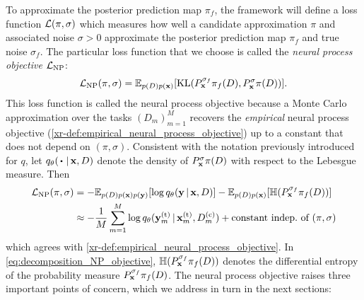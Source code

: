 \documentclass[12pt, twoside]{report}
\newcommand{\xrprefix}[1]{xr-#1}
\begin{document}
To approximate the posterior prediction map $\pi_f$,
the framework will define a loss function $\mathcal{L}(\pi, \sigma)$ which measures how well a candidate approximation $\pi$ and associated noise $\sigma > 0$ approximate the posterior prediction map $\pi_f$ and true noise $\sigma_f$.
The particular loss function that we choose is called the \emph{neural process objective} $\L\ss{NP}$:
\begin{equation}
    \L\ss{NP}(\pi, \sigma)
    = \E_{p(D)p(\vx)}[\KL(P^{\sigma_f}_\vx \pi_f(D), P^{\sigma}_\vx \pi(D))].
\end{equation}
This loss function is called the neural process objective because a Monte Carlo approximation over the tasks $(D_m)_{m=1}^M$
recovers the \emph{empirical} neural process objective (\cref{\xrprefix{def:empirical_neural_process_objective}}) up to a constant that does not depend on $(\pi, \sigma)$.
Consistent with the notation previously introduced for $q$, let $q_\theta(\vardot\cond \vx, D)$ denote the density of $P^\sigma_{\mathbf{x}} \pi(D)$ with respect to the Lebesgue measure. %
Then
\begin{align}
    \L\ss{NP}(\pi, \sigma)
    &= -\E_{p(D)p(\vx)p(\vy)}[\log q_{\theta}(\vy \cond \vx, D)]
    - \E_{p(D)p(\vx)}[\Hb(P^{\sigma_f}_\vx \pi_f(D))] \label{eq:decomposition_NP_objective} \\
    &\approx -\frac1M \sum_{m=1}^M \log q_{\theta}(\vy_m\us{(t)} \cond \vx\us{(t)}_m, D\us{(c)}_m)
    + \text{constant indep.\ of $(\pi, \sigma)$}
    \label{eq:neural_process_objective_next_to_KL_objective}
\end{align}
which agrees with \cref{\xrprefix{def:empirical_neural_process_objective}}.
In \eqref{eq:decomposition_NP_objective}, $\mathbb{H}(P^{\sigma_f}_{\mathbf{x}} \pi_f(D))$ denotes the differential entropy of the probability measure $P^{\sigma_f}_{\mathbf{x}} \pi_f(D)$.
The neural process objective raises three important points of concern, which we address in turn in the next sections:
\end{document}

